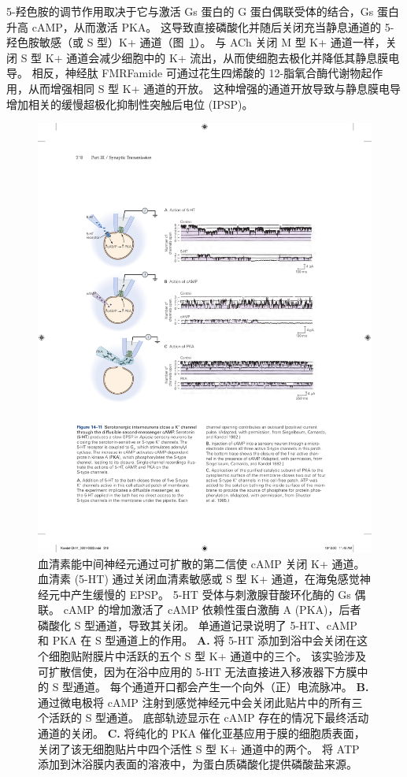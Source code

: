 5-羟色胺的调节作用取决于它与激活 Gs 蛋白的 G 蛋白偶联受体的结合，Gs 蛋白升高 cAMP，从而激活 PKA。
这导致直接磷酸化并随后关闭充当静息通道的 5-羟色胺敏感（或 S 型）K+ 通道（图~\ref{fig:14_11}）。
与 ACh 关闭 M 型 K+ 通道一样，关闭 S 型 K+ 通道会减少细胞中的 K+ 流出，从而使细胞去极化并降低其静息膜电导。
相反，神经肽 FMRFamide 可通过花生四烯酸的 12-脂氧合酶代谢物起作用，从而增强相同 S 型 K+ 通道的开放。
这种增强的通道开放导致与静息膜电导增加相关的缓慢超极化抑制性突触后电位 (IPSP)。


\begin{figure}[htbp]
	\centering
	\includegraphics[width=0.85\linewidth]{chap14/fig_14_11}
	\caption{血清素能中间神经元通过可扩散的第二信使 cAMP 关闭 K+ 通道。
		血清素 (5-HT) 通过关闭血清素敏感或 S 型 K+ 通道，在海兔感觉神经元中产生缓慢的 EPSP。
		5-HT 受体与刺激腺苷酸环化酶的 Gs 偶联。 cAMP 的增加激活了 cAMP 依赖性蛋白激酶 A (PKA)，后者磷酸化 S 型通道，导致其关闭。
		单通道记录说明了 5-HT、cAMP 和 PKA 在 S 型通道上的作用。
		\textbf{A. }将 5-HT 添加到浴中会关闭在这个细胞贴附膜片中活跃的五个 S 型 K+ 通道中的三个。
		该实验涉及可扩散信使，因为在浴中应用的 5-HT 无法直接进入移液器下方膜中的 S 型通道。
		每个通道开口都会产生一个向外（正）电流脉冲\cite{siegelbaum1982serotonin}。
		\textbf{B.} 通过微电极将 cAMP 注射到感觉神经元中会关闭此贴片中的所有三个活跃的 S 型通道。
		底部轨迹显示在 cAMP 存在的情况下最终活动通道的关闭\cite{siegelbaum1982serotonin}。
		\textbf{C.} 将纯化的 PKA 催化亚基应用于膜的细胞质表面，关闭了该无细胞贴片中四个活性 S 型 K+ 通道中的两个。
		将 ATP 添加到沐浴膜内表面的溶液中，为蛋白质磷酸化提供磷酸盐来源\cite{shuster1985cyclic}。}
	\label{fig:14_11}
\end{figure}


